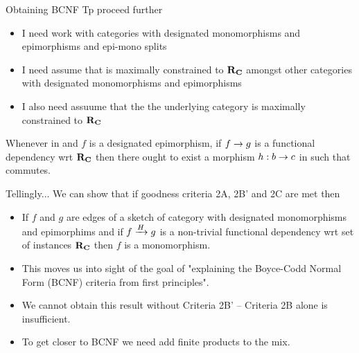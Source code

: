 \begin{frame}{Obtaining BCNF}
Tp proceed further 
\begin{itemize}
    \item I need work with categories \catcw with designated monomorphisms and epimorphisms
    and epi-mono splits 
    \item I need assume that \catcw is maximally constrained to $\reqtc$ 
    amongst other categories with designated monomorphisms and epimorphisms
    \item I also need assuume that the the underlying category is 
    maximally constrained to $\reqtc$
\end{itemize}

\medskip
{} Whenever \fgsourcediagram in \catc and  $f$ is a designated epimorphism, if
$f \morph g$ is a functional dependency  wrt $\reqtc$ then there ought to exist a morphism
$h: b \morph c$ in \catcw such that
commutes.
\end{frame}

\begin{frame}{Tellingly...}
We can show that if
 goodness criteria 2A,  2B' and 2C are met then 
\begin{itemize}
\item If $f$ and $g$ are edges of a sketch of category \catcw 
with designated monomorphisms and epimorphims and if $\fundep{H}{f}{g}$ is a non-trivial  functional dependency wrt set of instances $\reqtc$ then $f$ is a monomorphism. 

\item This moves us into sight of the goal of "explaining the Boyce-Codd Normal Form (BCNF) criteria from first principles". 

\item We cannot obtain this result without Criteria 2B' -- Criteria 2B alone is insufficient.

\item To get closer to BCNF we need add finite products to the mix.
\end{itemize}
\end{frame}
